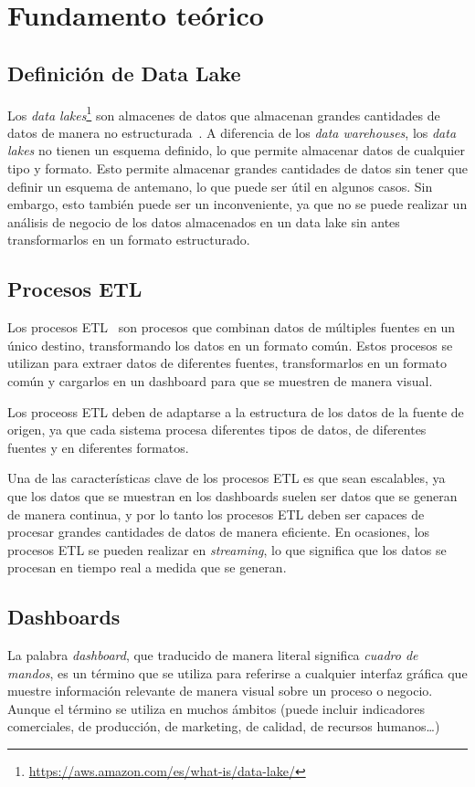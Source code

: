 \chapter{Fundamento teórico}\label{chap:teoria}
\section{Definición de Data Lake}\label{sec:datalake}
Los \textit{data lakes}\footnote{\url{https://aws.amazon.com/es/what-is/data-lake/}}
son almacenes de datos que almacenan grandes cantidades de datos de manera no
estructurada~\cite{mier2023dashboards}. A diferencia de los \textit{data warehouses},
los \textit{data lakes} no tienen un esquema definido, lo que permite
almacenar datos de cualquier tipo y formato. Esto permite almacenar grandes
cantidades de datos sin tener que definir un esquema de antemano, lo que puede
ser útil en algunos casos. Sin embargo, esto también puede ser un inconveniente, ya
que no se puede realizar un análisis de negocio de los datos almacenados en un
data lake sin antes transformarlos en un formato estructurado.

\section{Procesos ETL}\label{sec:etl}
Los procesos ETL~\cite{mier2023dashboards} son procesos que combinan datos de múltiples
fuentes en un único destino, transformando los datos en un formato común. Estos procesos
se utilizan para extraer datos de diferentes fuentes, transformarlos en un formato común
y cargarlos en un dashboard para que se muestren de manera visual.

Los proceoss ETL deben de adaptarse a la estructura de los datos de la fuente de origen,
ya que cada sistema procesa diferentes tipos de datos, de diferentes fuentes y en diferentes formatos.

Una de las características clave de los procesos ETL es que sean escalables, ya que los datos
que se muestran en los dashboards suelen ser datos que se generan de manera continua, y por
lo tanto los procesos ETL deben ser capaces de procesar grandes cantidades de datos de manera
eficiente. En ocasiones, los procesos ETL se pueden realizar en \textit{streaming}, lo que
significa que los datos se procesan en tiempo real a medida que se generan.

\section{Dashboards}\label{sec:dashboards}
La palabra \textit{dashboard}, que traducido de manera literal significa \textit{cuadro de mandos},
es un término que se utiliza para referirse a cualquier interfaz gráfica que muestre información
relevante de manera visual sobre un proceso o negocio. Aunque el término se utiliza en
muchos ámbitos (puede incluir indicadores comerciales, de producción, de marketing, de
calidad, de recursos humanos\ldots)


